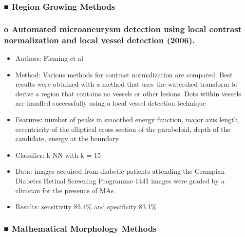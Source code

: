 \documentclass[12pt]{report}
\begin{document}
\subsubsection{■ Region Growing Methods}
\subsubsection{o    Automated microaneurysm detection using local contrast normalization and local vessel detection (2006). \cite{fleming2006automated}}
\begin{itemize}
\item Authors: Fleming et al
\item Method: Various methods for contrast normalization are compared. Best results were obtained with a method that uses the watershed transform to derive a region that contains no vessels or other lesions. Dots within vessels are handled successfully using a local vessel detection technique
\item Features: number of peaks in smoothed energy function, major axis length, eccentricity of the elliptical cross section of the paraboloid, depth of the candidate, energy at the boundary
\item Classifier: k-NN with k = 15
\item Data: images acquired from diabetic patients attending the Grampian Diabetes Retinal Screening Programme 1441 images were graded by a clinician for the presence of MAs
\item Results: sensitivity 85.4\% and specificity 83.1\%
\end{itemize}

\subsubsection{■ Mathematical Morphology Methods}
\end{document}
